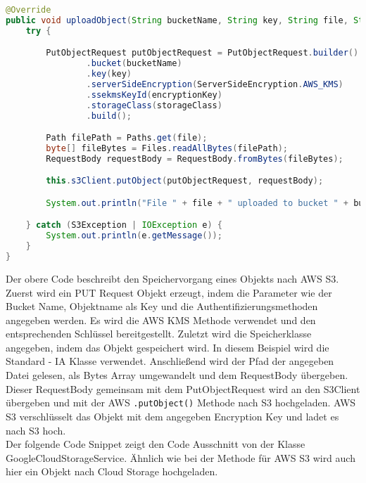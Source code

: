 \begin{lstlisting}[language=Java, caption=Prototyp Code Snippet - Hochladen eines Objekts nach S3]
@Override
public void uploadObject(String bucketName, String key, String file, String encryptionKey, String storageClass) {
    try {

        PutObjectRequest putObjectRequest = PutObjectRequest.builder()
                .bucket(bucketName)
                .key(key)
                .serverSideEncryption(ServerSideEncryption.AWS_KMS)
                .ssekmsKeyId(encryptionKey)
                .storageClass(storageClass)
                .build();

        Path filePath = Paths.get(file);
        byte[] fileBytes = Files.readAllBytes(filePath);
        RequestBody requestBody = RequestBody.fromBytes(fileBytes);

        this.s3Client.putObject(putObjectRequest, requestBody);

        System.out.println("File " + file + " uploaded to bucket " + bucketName + " as " + key);

    } catch (S3Exception | IOException e) {
        System.out.println(e.getMessage());
    }
}
\end{lstlisting}

\newpage

Der obere Code beschreibt den Speichervorgang eines Objekts nach AWS S3. Zuerst wird ein PUT Request Objekt erzeugt, indem die Parameter wie der Bucket Name, Objektname als Key und die Authentifizierungsmethoden angegeben werden. Es wird die AWS KMS Methode verwendet und den entsprechenden Schlüssel bereitgestellt. Zuletzt wird die Speicherklasse angegeben, indem das Objekt gespeichert wird. In diesem Beispiel wird die Standard - IA Klasse verwendet. Anschließend wird der Pfad der angegeben Datei gelesen, als Bytes Array umgewandelt und dem RequestBody übergeben. Dieser RequestBody gemeinsam mit dem PutObjectRequest wird an den S3Client übergeben und mit der AWS \verb|.putObject()| Methode nach S3 hochgeladen. AWS S3 verschlüsselt das Objekt mit dem angegeben Encryption Key und ladet es nach S3 hoch.\\

Der folgende Code Snippet zeigt den Code Ausschnitt von der Klasse GoogleCloudStorageService. Ähnlich wie bei der Methode für AWS S3 wird auch hier ein Objekt nach Cloud Storage hochgeladen. 

